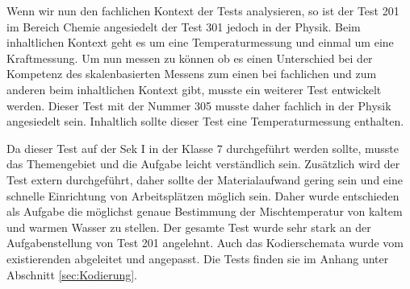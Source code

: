 Wenn wir nun den fachlichen Kontext der Tests analysieren, so ist der Test 201 im Bereich Chemie angesiedelt der Test 301 jedoch in der Physik. Beim inhaltlichen Kontext geht es um eine Temperaturmessung und einmal um eine Kraftmessung. Um nun messen zu können ob es einen Unterschied bei der Kompetenz des skalenbasierten Messens zum einen bei fachlichen und zum anderen beim inhaltlichen Kontext gibt, musste ein weiterer Test entwickelt werden. Dieser Test mit der Nummer 305 musste daher fachlich in der Physik angesiedelt sein. Inhaltlich sollte dieser Test eine Temperaturmessung enthalten.

Da dieser Test auf der Sek I in der Klasse 7 durchgeführt werden sollte, musste das Themengebiet und die Aufgabe leicht verständlich sein. Zusätzlich wird der Test extern durchgeführt, daher sollte der Materialaufwand gering sein und eine schnelle Einrichtung von Arbeitsplätzen möglich sein. Daher wurde entschieden als Aufgabe die möglichst genaue Bestimmung der Mischtemperatur von kaltem und warmen Wasser zu stellen. Der gesamte Test wurde sehr stark an der Aufgabenstellung von Test 201 angelehnt. Auch das Kodierschemata wurde vom existierenden abgeleitet und angepasst. Die Tests finden sie im Anhang unter Abschnitt \ref{sec:Kodierung}.

